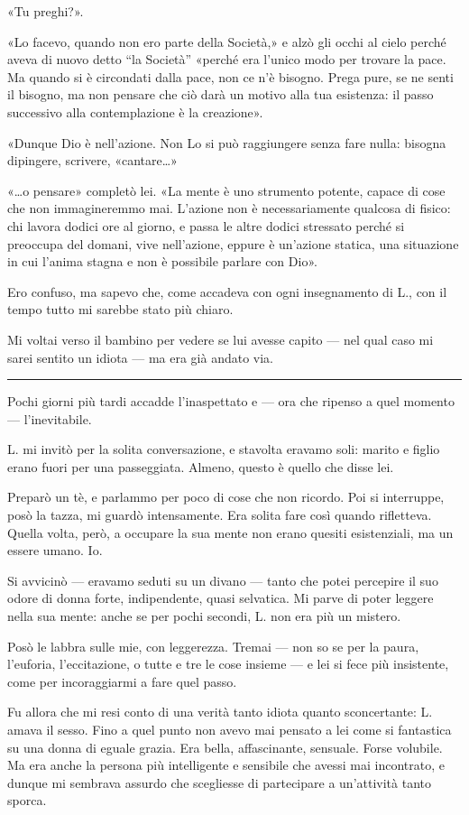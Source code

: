 «Tu preghi?».

«Lo facevo, quando non ero parte della Società,» e alzò gli occhi al cielo perché aveva di nuovo
detto ``la Società'' «perché era l'unico modo per trovare la pace. Ma quando si è circondati dalla
pace, non ce n'è bisogno. Prega pure, se ne senti il bisogno, ma non pensare che ciò darà un motivo
alla tua esistenza: il passo successivo alla contemplazione è la creazione».

«Dunque Dio è nell'azione. Non Lo si può raggiungere senza fare nulla: bisogna dipingere, scrivere,
«cantare\dots{}»

«\dots{}o pensare» completò lei. «La mente è uno strumento potente, capace di cose che non
immagineremmo mai. L'azione non è necessariamente qualcosa di fisico: chi lavora dodici ore al
giorno, e passa le altre dodici stressato perché si preoccupa del domani, vive nell'azione, eppure è
un'azione statica, una situazione in cui l'anima stagna e non è possibile parlare con Dio».

Ero confuso, ma sapevo che, come accadeva con ogni insegnamento di L., con il tempo tutto mi sarebbe
stato più chiaro.

Mi voltai verso il bambino per vedere se lui avesse capito --- nel qual caso mi sarei sentito un
idiota --- ma era già andato via.

\plainbreak{1}

Pochi giorni più tardi accadde l'inaspettato e --- ora che ripenso a quel momento --- l'inevitabile.

L. mi invitò per la solita conversazione, e stavolta eravamo soli: marito e figlio erano fuori per
una passeggiata. Almeno, questo è quello che disse lei.

Preparò un tè, e parlammo per poco di cose che non ricordo. Poi si interruppe, posò la tazza, mi
guardò intensamente. Era solita fare così quando rifletteva. Quella volta, però, a occupare la sua
mente non erano quesiti esistenziali, ma un essere umano. Io.

Si avvicinò --- eravamo seduti su un divano --- tanto che potei percepire il suo odore di donna
forte, indipendente, quasi selvatica. Mi parve di poter leggere nella sua mente: anche se per pochi
secondi, L. non era più un mistero.

Posò le labbra sulle mie, con leggerezza. Tremai --- non so se per la paura, l'euforia,
l'eccitazione, o tutte e tre le cose insieme --- e lei si fece più insistente, come per
incoraggiarmi a fare quel passo.

Fu allora che mi resi conto di una verità tanto idiota quanto sconcertante: L. amava il sesso. Fino
a quel punto non avevo mai pensato a lei come si fantastica su una donna di eguale grazia. Era
bella, affascinante, sensuale. Forse volubile. Ma era anche la persona più intelligente e sensibile
che avessi mai incontrato, e dunque mi sembrava assurdo che scegliesse di partecipare a un'attività
tanto sporca.


